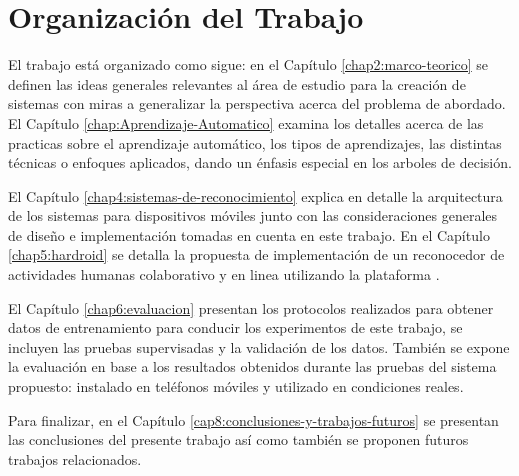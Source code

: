 \section{Organización del Trabajo}

\label{sec14:organizaciuxf3n-del-trabajo}El trabajo está organizado
como sigue: en el Capítulo \ref{chap2:marco-teorico} se definen las
ideas generales relevantes al área de estudio para la creación de
sistemas  con miras a generalizar la perspectiva acerca
del problema de abordado. El Capítulo \ref{chap:Aprendizaje-Automatico}
examina los detalles acerca de las practicas sobre el aprendizaje
automático, los tipos de aprendizajes, las distintas técnicas o enfoques
aplicados, dando un énfasis especial en los arboles de decisión. 

El Capítulo \ref{chap4:sistemas-de-reconocimiento} explica en detalle
la arquitectura de los sistemas  para dispositivos móviles
junto con las consideraciones generales de diseño e implementación
tomadas en cuenta en este trabajo. En el Capítulo \ref{chap5:hardroid}
se detalla la propuesta de implementación de un reconocedor de actividades
humanas colaborativo y en linea utilizando la plataforma .

El Capítulo \ref{chap6:evaluacion} presentan los protocolos realizados
para obtener datos de entrenamiento para conducir los experimentos
de este trabajo, se incluyen las pruebas supervisadas y la validación
de los datos. También se expone la evaluación en base a los resultados
obtenidos durante las pruebas del sistema  propuesto: instalado
en teléfonos móviles y utilizado en condiciones reales. 

Para finalizar, en el Capítulo \ref{cap8:conclusiones-y-trabajos-futuros}
se presentan las conclusiones del presente trabajo así como también
se proponen futuros trabajos relacionados. 
